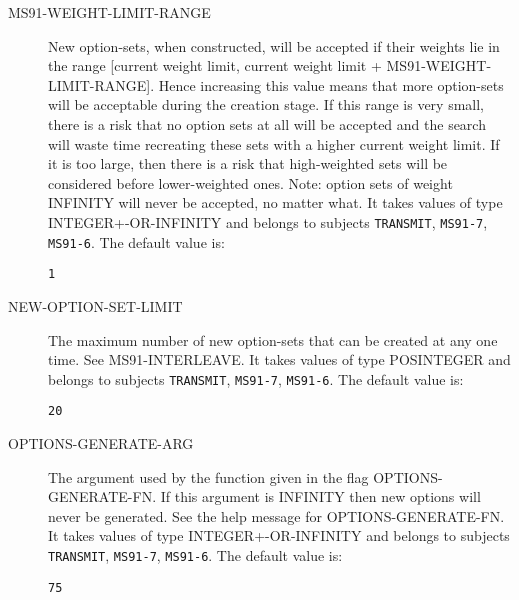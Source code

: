 \begin{description}
\item[MS91-WEIGHT-LIMIT-RANGE]  
New option-sets, when constructed, will be accepted if their weights lie
in the range [current weight limit, current weight limit + MS91-WEIGHT-LIMIT-RANGE].
Hence increasing this value means that more option-sets will be acceptable during 
the creation stage. If this range is very small, there is a risk that no option
sets at all will be accepted and the search will waste time recreating these sets
with a higher current weight limit. If it is too large, then there is a risk that
high-weighted sets will be considered before lower-weighted ones.
Note: option sets of weight INFINITY will never be accepted, no matter what.
It takes values of type INTEGER+-OR-INFINITY and belongs to subjects \texttt{TRANSMIT}, \texttt{MS91-7}, \texttt{MS91-6}.  The default value is: \begin{lstlisting}
1
\end{lstlisting}

\item[NEW-OPTION-SET-LIMIT]  
The maximum number of new option-sets that can be created at
any one time. See MS91-INTERLEAVE.
It takes values of type POSINTEGER and belongs to subjects \texttt{TRANSMIT}, \texttt{MS91-7}, \texttt{MS91-6}.  The default value is: \begin{lstlisting}
20
\end{lstlisting}

\item[OPTIONS-GENERATE-ARG]  
The argument used by the function given in the flag 
OPTIONS-GENERATE-FN. If this argument is INFINITY then new options will
never be generated. See the help message for OPTIONS-GENERATE-FN.
It takes values of type INTEGER+-OR-INFINITY and belongs to subjects \texttt{TRANSMIT}, \texttt{MS91-7}, \texttt{MS91-6}.  The default value is: \begin{lstlisting}
75
\end{lstlisting}


\end{description}
